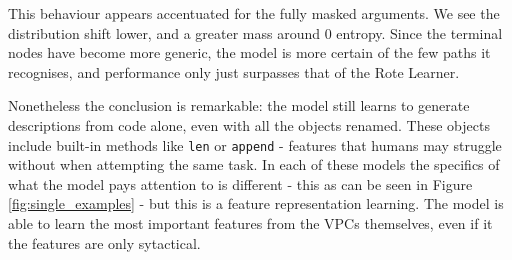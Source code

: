 
This behaviour appears accentuated for the fully masked arguments. We see the distribution shift lower, and a greater mass around 0 entropy. Since the terminal nodes have become more generic, the model is more certain of the few paths it recognises, and performance only just surpasses that of the Rote Learner. 


Nonetheless the conclusion is remarkable: the model still learns to generate descriptions from code alone, even with all the objects renamed. These objects include built-in methods like \texttt{len} or \texttt{append} - features that humans may struggle without when attempting the same task. 
In each of these models the specifics of what the model pays attention to is different - this as can be seen in  Figure \ref{fig:single_examples} - but this is a feature representation learning. 
The model is able to learn the most important features from the VPCs themselves, even if it the features are only sytactical.


